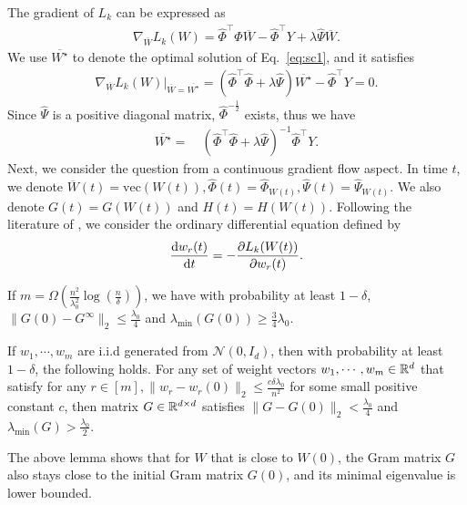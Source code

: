 The gradient of $L_k$ can be expressed as
\begin{align}
\label{eq:nabla_W}
\nabla_{\overline{W}} L_k(W) = \hat{\Phi}^{\top}\hat{\Phi} \overline{W} - \hat{\Phi}^{\top} Y + \lambda\hat{\Psi} \overline{W}.
\end{align}
We use $\overline{W^{\star}}$ to denote the optimal solution of Eq.~\eqref{eq:sc1}, and it satisfies 
\begin{align}
\label{eq:st2}
    \nabla_{\overline{W}} L_k(W)\big|_{\overline{W} = \overline{W^{\star}}} = (\hat{\Phi}^{\top}\hat{\Phi} + \lambda \hat{\Psi})\overline{W^{\star}} - \hat{\Phi}^{\top}Y = 0.
\end{align}
Since $\hat{\Psi}$ is a positive diagonal matrix, $\hat{\Phi}^{-\frac{1}{2}}$ exists, thus we have
\begin{align*}
    \overline{W^{\star}} = & ~ (\hat{\Phi}^\top \hat{\Phi} + \lambda \hat{\Psi})^{-1} \hat{\Phi}^\top Y.
\end{align*}
Next, we consider the question from a continuous gradient flow aspect. In time $t$, we denote $\overline{W}(t) = \mathrm{vec}(W(t)), \hat{\Phi}(t) = \hat{\Phi}_{W(t)}, \hat{\Psi}(t) = \hat{\Psi}_{W(t)}$. We also denote $G(t) = G(W(t))$ and $H(t) = H(W(t))$. Following the literature of \cite{dzps19}, we consider the ordinary differential equation defined by
\begin{align}
    \label{eq:ode_flow}
    \frac{\mathrm{d} w_r(t)}{\mathrm{d} t} = - \frac{\partial L_k(W(t))}{\partial w_r(t)}.
\end{align}

\begin{lemma}\label{lem:dzps3.1}
If $m = \Omega(\frac{n^2}{\lambda_0^2}\log(\frac{n}{\delta}))$, we have with probability at least $1-\delta$, $\|G(0) - G^{\infty}\|_2 \leq \frac{\lambda_0}{4}$ and $\lambda_{\min}(G(0))\geq \frac{3}{4}\lambda_0$.
\end{lemma}

\begin{lemma}\label{lem:dzps3.2}
If $w_1,\cdots, w_m$ are i.i.d generated from $\mathcal{N}(0,I_d)$, then with probability at least $1-\delta$, the following holds. For any set of weight vectors $w_1,\cdots,w_m \in\mathbb{R}^d$ that satisfy for any $r\in [m], \|w_r - w_r(0)\|_2\leq \frac{c\delta \lambda_0}{n^2}$ for some small positive constant $c$, then matrix $G\in\mathbb{R}^{d\times d}$ satisfies $\|G - G(0)\|_2 < \frac{\lambda_0}{4}$ and $\lambda_{\min}(G) > \frac{\lambda_0}{2}$.
\end{lemma}
The above lemma shows that for $W$ that is close to $W(0)$, the Gram matrix $G$ also stays close to the initial Gram matrix $G(0)$, and its minimal eigenvalue is lower bounded. 

